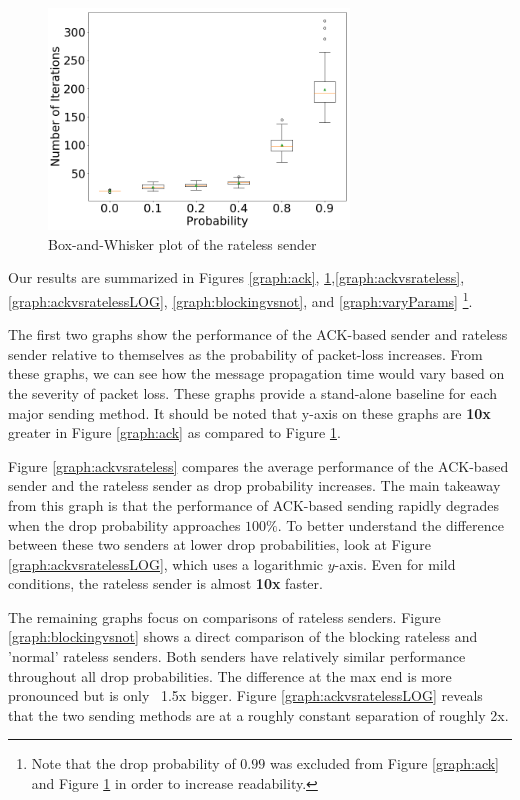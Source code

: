 \begin{figure}[tp]
\centering
\noindent
\includegraphics[width=8cm]{figures/rateless_FINAL.png}
\caption{Box-and-Whisker plot of the rateless sender}
\label{graph:rateless}
\end{figure}


Our results are summarized in Figures \ref{graph:ack}, \ref{graph:rateless},\ref{graph:ackvsrateless}, \ref{graph:ackvsratelessLOG}, \ref{graph:blockingvsnot}, and \ref{graph:varyParams} \footnote{Note that the drop probability of $0.99$ was excluded from Figure \ref{graph:ack} and Figure \ref{graph:rateless} in order to increase readability.}.

The first two graphs show the performance of the ACK-based sender and rateless sender relative to themselves as the probability of packet-loss increases. From these graphs, we can see how the message propagation time would vary based on the severity of packet loss. These graphs provide a stand-alone baseline for each major sending method. It should be noted that y-axis on these graphs are \textbf{10x} greater in Figure \ref{graph:ack} as compared to Figure \ref{graph:rateless}.

Figure \ref{graph:ackvsrateless} compares the average performance of the ACK-based sender and the rateless sender as drop probability increases. The main takeaway from this graph is that the performance of ACK-based sending rapidly degrades when the drop probability approaches $100\%$. To better understand the difference between these two senders at lower drop probabilities, look at Figure \ref{graph:ackvsratelessLOG}, which uses a logarithmic $y$-axis. Even for mild conditions, the rateless sender is almost \textbf{10x} faster. 

The remaining graphs focus on comparisons of rateless senders. Figure \ref{graph:blockingvsnot} shows a direct comparison of the blocking rateless and 'normal' rateless senders. Both senders have relatively similar performance throughout all drop probabilities. The difference at the max end is more pronounced but is only ~1.5x bigger. Figure \ref{graph:ackvsratelessLOG} reveals that the two sending methods are at a roughly constant separation of roughly 2x.

